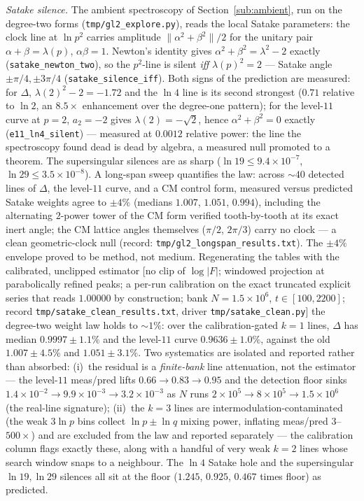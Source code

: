 \documentclass[11pt]{article}
\newcommand{\code}[1]{\texttt{#1}}
\begin{document}
\emph{Satake silence.}  The ambient spectroscopy of Section~\ref{sub:ambient}, run on the
degree-two forms (\code{tmp/gl2\_explore.py}), reads the local Satake parameters: the clock line at
$\ln p^{2}$ carries amplitude $\|\alpha^2+\beta^2\|/2$ for the unitary pair
$\alpha+\beta=\lambda(p)$, $\alpha\beta=1$.  Newton's identity gives
$\alpha^2+\beta^2=\lambda^2-2$ exactly (\code{satake\_newton\_two}), so the $p^2$-line is silent
\emph{iff} $\lambda(p)^2=2$ --- Satake angle $\pm\pi/4,\pm3\pi/4$ (\code{satake\_silence\_iff}).
Both signs of the prediction are measured: for $\Delta$, $\lambda(2)^2-2=-1.72$ and the $\ln4$ line
is its second strongest ($0.71$ relative to $\ln2$, an $8.5\times$ enhancement over the degree-one
pattern); for the level-$11$ curve at $p=2$, $a_2=-2$ gives $\lambda(2)=-\sqrt2$, hence
$\alpha^2+\beta^2=0$ exactly (\code{e11\_ln4\_silent}) --- measured at $0.0012$ relative power:
the line the spectroscopy found dead is dead by algebra, a measured null promoted to a theorem.
The supersingular silences are as sharp ($\ln19\le9.4\times10^{-7}$, $\ln29\le3.5\times10^{-8}$).  A long-span sweep quantifies the law:
across ${\sim}40$ detected lines of $\Delta$, the level-$11$ curve, and a CM control form, measured
versus predicted Satake weights agree to $\pm4\%$ (medians $1.007$, $1.051$, $0.994$), including
the alternating $2$-power tower of the CM form verified tooth-by-tooth at its exact inert angle;
the CM lattice angles themselves ($\pi/2$, $2\pi/3$) carry no clock --- a clean geometric-clock
null (record: \code{tmp/gl2\_longspan\_results.txt}).  The $\pm4\%$ envelope proved to be method,
not medium.  Regenerating the tables with the calibrated, unclipped estimator [no clip of
$\log|F|$; windowed projection at parabolically refined peaks; a per-run calibration on the exact
truncated explicit series that reads $1.00000$ by construction; bank $N=1.5\times10^{6}$, $t\in[100,2200]$;
record \code{tmp/satake\_clean\_results.txt}, driver \code{tmp/satake\_clean.py}] the degree-two
weight law holds to ${\sim}1\%$: over the calibration-gated $k=1$ lines, $\Delta$ has
median $0.9997\pm1.1\%$ and the level-$11$ curve $0.9636\pm1.0\%$, against the old
$1.007\pm4.5\%$ and $1.051\pm3.1\%$.  Two systematics are isolated and reported rather than
absorbed: (i)~the residual is a \emph{finite-bank} line attenuation, not the estimator --- the
level-$11$ meas/pred lifts $0.66\to0.83\to0.95$ and the detection floor sinks
$1.4\times10^{-2}\to9.9\times10^{-3}\to3.2\times10^{-3}$ as $N$ runs $2\!\times\!10^{5}\to8\!\times\!10^{5}\to1.5\!\times\!10^{6}$
(the real-line signature); (ii)~the $k=3$ lines are intermodulation-contaminated (the weak
$3\ln p$ bins collect $\ln p\pm\ln q$ mixing power, inflating meas/pred $3$--$500\times$) and are
excluded from the law and reported separately --- the calibration column flags exactly these,
along with a handful of very weak $k=2$ lines whose search window snaps to a neighbour.  The
$\ln4$ Satake hole and the supersingular $\ln19,\ln29$ silences all sit at the floor
($1.245$, $0.925$, $0.467$ times floor) as predicted.
\end{document}
